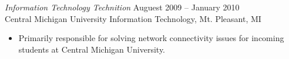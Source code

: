 \documentclass[10pt]{res} %
\begin{document}
\begin{resume}
{\sl Information Technology Technition} \hfill Auguest 2009 -- January 2010 \\
Central Michigan University Information Technology, Mt. Pleasant, MI
\begin{itemize}
  \item Primarily responsible for solving network connectivity issues for incoming students
    at Central Michigan University.
\end{itemize}
%

\end{resume}
\end{document}
